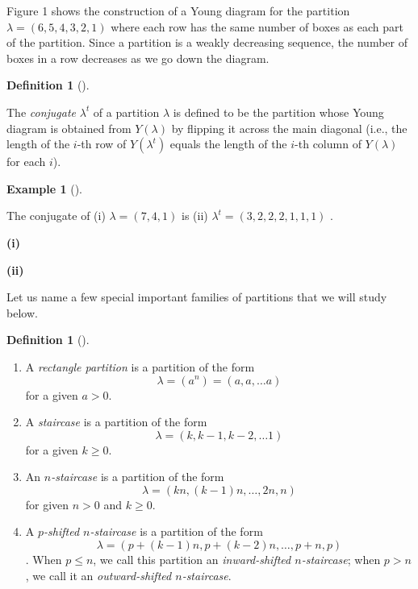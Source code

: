 \documentclass[numbers=enddot,12pt,final,onecolumn,notitlepage]{scrartcl}%
\theoremstyle{definition}
\newtheorem{defi}[theo]{Definition}
\newenvironment{definition}[1][]
{\begin{defi}[#1]\begin{leftbar}}
{\end{leftbar}\end{defi}}
\newtheorem{exam}[theo]{Example}
\newenvironment{example}[1][]
{\begin{exam}[#1]\begin{leftbar}}
{\end{leftbar}\end{exam}}
\newcommand{\tup}[1]{\left( #1 \right)}
\renewcommand{\leq}{\leqslant}
\renewcommand{\geq}{\geqslant}
\theoremstyle{plainsl}
\begin{document}
Figure 1 shows the construction of a Young diagram for the partition $\lambda = (6,5,4,3,2,1)$ where each row has the same number of boxes as each part of the partition. Since a partition is a weakly decreasing sequence, the number of boxes in a row decreases as we go down the diagram.

\begin{definition}
The \emph{conjugate} $\lambda^t$ of a partition $\lambda$ is defined to be the partition whose Young diagram is obtained from $Y\tup{\lambda}$ by flipping it across the main diagonal (i.e., the length of the $i$-th row of $Y\tup{\lambda^t}$ equals the length of the $i$-th column of $Y\tup{\lambda}$ for each $i$).
\end{definition} 

\begin{example}
The conjugate of (i) $\lambda = (7,4,1)$ is (ii) $\lambda^t =(3,2,2,2,1,1,1)$ . \\

\begin{minipage}[t]{0.49\textwidth}
\begin{center}

\textbf{(i)}
\end{center}
\end{minipage}
\begin{minipage}[t]{0.49\textwidth}
\begin{center}
\textbf{(ii)}
\end{center}
\end{minipage}

 

\end{example}
Let us name a few special important families of partitions that we will study below.

\begin{definition}
\begin{enumerate}
    \item A \emph{rectangle partition} is a partition of the form 
\[\lambda = (a^n) = (a,a, \ldots a)\]
for a given $a > 0$.
    \item A \emph{staircase} is a partition of the form 
\[\lambda = (k, k-1, k-2, \ldots 1)\]
for a given $k \geq 0$.
    \item An \emph{$n$-staircase} is a partition of the form 
\[\lambda = (kn, (k-1)n, \ldots, 2n,  n)\]
for given $n > 0$ and $k \geq 0$.
    \item A \emph{$p$-shifted $n$-staircase} is a partition of the form
\[\lambda = (p+(k-1)n, p+(k-2)n, \ldots,p+n, p) \].
When $p \leq n$, we call this partition an \emph{inward-shifted $n$-staircase};
when $p > n$, we call it an \emph{outward-shifted $n$-staircase}.
\end{enumerate}

\end{definition}
\end{document}
